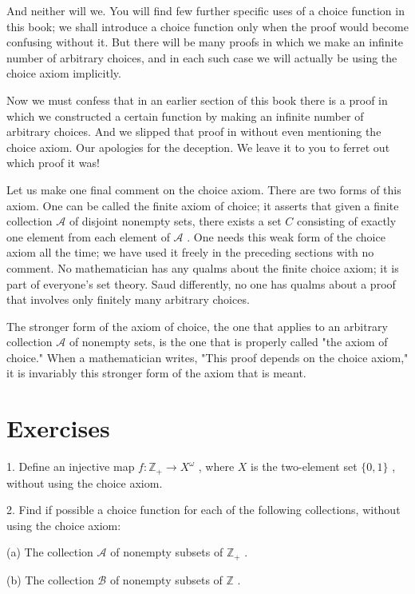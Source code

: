 \documentclass[10pt]{article}
\begin{document}
And neither will we. You will find few further specific uses of a choice function in this book; we shall introduce a choice function only when the proof would become confusing without it. But there will be many proofs in which we make an infinite number of arbitrary choices, and in each such case we will actually be using the choice axiom implicitly.

Now we must confess that in an earlier section of this book there is a proof in which we constructed a certain function by making an infinite number of arbitrary choices. And we slipped that proof in without even mentioning the choice axiom. Our apologies for the deception. We leave it to you to ferret out which proof it was!

Let us make one final comment on the choice axiom. There are two forms of this axiom. One can be called the finite axiom of choice; it asserts that given a finite collection \(\mathcal{A}\) of disjoint nonempty sets, there exists a set \(C\) consisting of exactly one element from each element of \(\mathcal{A}\) . One needs this weak form of the choice axiom all the time; we have used it freely in the preceding sections with no comment. No mathematician has any qualms about the finite choice axiom; it is part of everyone's set theory. Saud differently, no one has qualms about a proof that involves only finitely many arbitrary choices.

The stronger form of the axiom of choice, the one that applies to an arbitrary collection \(\mathcal{A}\) of nonempty sets, is the one that is properly called "the axiom of choice." When a mathematician writes, "This proof depends on the choice axiom," it is invariably this stronger form of the axiom that is meant.

\section*{Exercises}

1. Define an injective map \(f : {\mathbb{Z}}_{ + } \rightarrow  {X}^{\omega }\) , where \(X\) is the two-element set \(\{ 0,1\}\) , without using the choice axiom.

2. Find if possible a choice function for each of the following collections, without using the choice axiom:

(a) The collection \(\mathcal{A}\) of nonempty subsets of \({\mathbb{Z}}_{ + }\) .

(b) The collection \(\mathcal{B}\) of nonempty subsets of \(\mathbb{Z}\) .
\end{document}
